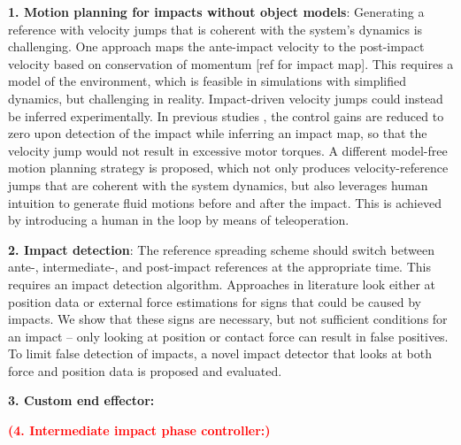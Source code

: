 \documentclass[a4paper, 10pt, conference]{ieeeconf}
\begin{document}
    \textbf{1. Motion planning for impacts without object models}: Generating a reference with velocity jumps that is coherent with the system’s dynamics is challenging. 
    One approach maps the ante-impact velocity to the post-impact velocity based on conservation of momentum [ref for impact map]. This requires a model of the environment, which is feasible in simulations with simplified dynamics, but challenging in reality.
    Impact-driven velocity jumps could instead be inferred experimentally. In previous studies \cite{aouajPredictingPostImpactVelocity2021}, the control gains are reduced to zero upon detection of the impact while inferring an impact map, so that the velocity jump would not result in excessive motor torques.
    A different model-free motion planning strategy is proposed, which not only produces velocity-reference jumps that are coherent with the system dynamics, but also leverages human intuition to generate fluid motions before and after the impact. This is achieved by introducing a human in the loop by means of teleoperation. %

    \textbf{2. Impact detection}: The reference spreading scheme should switch between ante-, intermediate-, and post-impact references at the appropriate time. This requires an impact detection algorithm. Approaches in literature look either at position data \cite{rijnenMotionSignalsVelocity2018} or external force estimations \cite{uitendaalTeachingRobotsInteraction2022,properAimAwareCollisionMonitoring2021,properValidationNumericalSimultaneous2022} for signs that could be caused by impacts. We show that these signs are necessary, but not sufficient conditions for an impact -- only looking at position or contact force can result in false positives. To limit false detection of impacts, a novel impact detector that looks at both force and position data is proposed and evaluated.

    \textbf{3. Custom end effector:}

    \textbf{\textcolor{red}{(4. Intermediate impact phase controller:)}}
\end{document}
